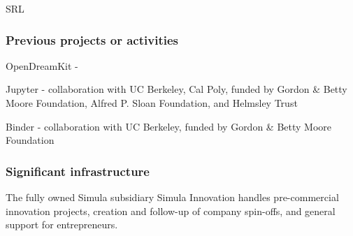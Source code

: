 \begin{sitedescription}{SRL}
\subsubsection*{Previous projects or activities}

\begin{compactenum}
\item OpenDreamKit -
\item Jupyter - collaboration with UC Berkeley, Cal Poly, funded by Gordon \&
  Betty Moore Foundation, Alfred P. Sloan Foundation, and Helmsley Trust
\item Binder - collaboration with UC Berkeley, funded by Gordon \& Betty Moore
  Foundation
\end{compactenum}

\subsubsection*{Significant infrastructure}

The fully owned Simula subsidiary Simula Innovation handles pre-commercial
innovation projects, creation and follow-up of company spin-offs, and general
support for entrepreneurs.

\end{sitedescription}






